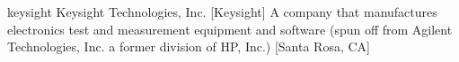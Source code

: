 \newglsXcompany%
{keysight}%
{Keysight Technologies, Inc.}%
[Keysight]%
{A company that manufactures electronics test and measurement equipment and software (spun off from Agilent Technologies, Inc. a former division of HP, Inc.) \cite{website:Keysight}}%
[Santa Rosa, CA]%